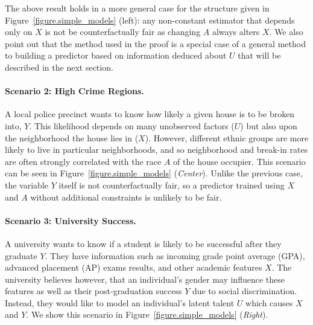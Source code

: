 The above result holds in a more general case for the structure given
in Figure~\ref{figure.simple_models} (left): any non-constant estimator that
depends only on $X$ is not be counterfactually fair as changing $A$ always alters $X$.
We also point out that the method used in the proof is a special case
of a general method to building a predictor based on information deduced
about $U$ that will be described in the next section.
%
%
\paragraph{Scenario 2: High Crime Regions.} 
A local police precinct wants to know how likely a given house is to be broken into, $Y$. This likelihood depends on many unobserved factors
($U$) but also upon the neighborhood the house lies in ($X$). However, different ethnic groups are more likely to live in particular neighborhoods, and so neighborhood and break-in rates are often strongly correlated with the 
race $A$ of the house occupier. This scenario can be seen in Figure~\ref{figure.simple_models} (\emph{Center}). Unlike the previous case, the variable $Y$ itself is not counterfactually fair, so a predictor trained using $X$ and $A$ without additional constraints is unlikely to be fair. 



\paragraph{Scenario 3: University Success.}
A university wants to know if a student is likely to be successful after they graduate $Y$. They have information such as incoming grade point average (GPA), advanced placement (AP) exams results, and other academic features $X$. The university believes however, that an individual's gender may influence these features as well as their post-graduation success $Y$ due to social discrimination. Instead, they would like to model an individual's latent talent $U$ which causes $X$ and $Y$. We show this scenario in Figure~\ref{figure.simple_models} (\emph{Right}).



